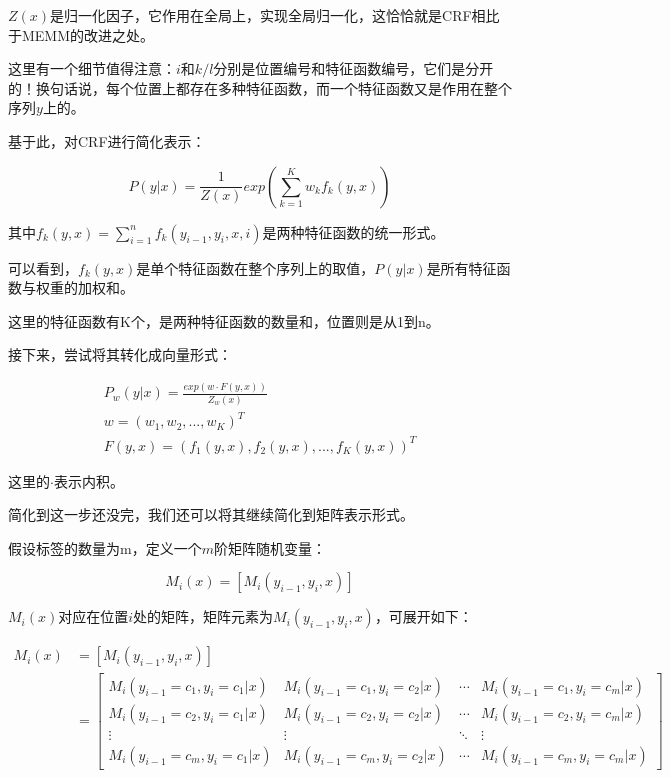 \documentclass[11pt]{article}
\begin{document}
$Z(x)$是归一化因子，它作用在全局上，实现全局归一化，这恰恰就是CRF相比于MEMM的改进之处。

这里有一个细节值得注意：$i$和$k/l$分别是位置编号和特征函数编号，它们是分开的！换句话说，每个位置上都存在多种特征函数，而一个特征函数又是作用在整个序列$y$上的。

基于此，对CRF进行简化表示：

\begin{equation}\label{key}
	P(y|x) = \frac{1}{Z(x)}exp(\sum_{k=1}^K w_kf_k(y, x))
\end{equation}

其中$f_k(y, x) = \sum_{i=1}^n f_k(y_{i-1}, y_i, x, i)$是两种特征函数的统一形式。

可以看到，$f_k(y, x)$是单个特征函数在整个序列上的取值，$P(y|x)$是所有特征函数与权重的加权和。

这里的特征函数有K个，是两种特征函数的数量和，位置则是从1到n。

接下来，尝试将其转化成向量形式：

\begin{gather*}\label{key}
	P_w(y|x) = \frac{exp(w \cdot F(y, x))}{Z_w(x)} \\
	w = (w_1, w_2, ..., w_K)^T \\
	F(y, x) = (f_1(y, x), f_2(y, x), ..., f_K(y, x))^T
\end{gather*}

这里的$\cdot$表示内积。

简化到这一步还没完，我们还可以将其继续简化到矩阵表示形式。

假设标签的数量为m，定义一个$m$阶矩阵随机变量：

\begin{equation}\label{key}
	M_i(x) = [M_i(y_{i-1}, y_i, x)]
\end{equation}

$M_i(x)$对应在位置$i$处的矩阵，矩阵元素为$M_i(y_{i-1}, y_i, x)$，可展开如下：


\begin{align*}		
	M_i(x) &= [M_i(y_{i-1}, y_i, x)] \\
		&= \begin{bmatrix}
		M_i(y_{i-1}=c_1, y_i=c_1|x) & M_i(y_{i-1}=c_1, y_i=c_2|x) & \cdots & M_i(y_{i-1}=c_1, y_i=c_m|x)\\
		M_i(y_{i-1}=c_2, y_i=c_1|x) & M_i(y_{i-1}=c_2, y_i=c_2|x) & \cdots & M_i(y_{i-1}=c_2, y_i=c_m|x)\\
		\vdots & \vdots & \ddots & \vdots\\
		M_i(y_{i-1}=c_m, y_i=c_1|x) & M_i(y_{i-1}=c_m, y_i=c_2|x) & \cdots & M_i(y_{i-1}=c_m, y_i=c_m|x)
	\end{bmatrix}
\end{align*}
\end{document}
